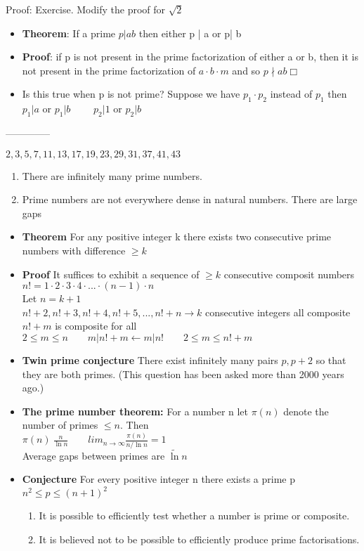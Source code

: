 \documentclass[9pt, letterpaper, oneside]{article}
\begin{document}
Proof: Exercise. Modify the proof for $\sqrt{2}$

\begin{itemize}
    \item \textbf{Theorem}: If a prime $p | ab$ then either p | a or p| b
    \item \textbf{Proof}: if p is not present in the prime factorization of either a or b, then it is not present in the prime factorization of $a \cdot b \cdot m$ and so $p \nmid a b \Box$
    \item Is this true when p is not prime? Suppose we have $p_1 \cdot p_2$ instead of $p_1$ then $p_1 | a$ or $p_1 | b \qquad$ $p_2 | 1$ or $p_2 | b$
\end{itemize}

--------------

$2,3,5,7,11,13,17,19,23,29,31,37,41,43$
\begin{enumerate}
    \item There are infinitely many prime numbers.
    \item Prime numbers are not everywhere dense in natural numbers. There are large gaps
\end{enumerate}

\begin{itemize}
    \item \textbf{Theorem} For any positive integer k there exists two consecutive prime numbers with difference $\geq k$
    \item \textbf{Proof} It suffices to exhibit a sequence of $\geq k$ consecutive composit numbers\\
            $n! = 1 \cdot 2 \cdot 3 \cdot 4 \cdot ... \cdot (n-1) \cdot n$\\
            Let $n = k + 1$\\
            $n! + 2, n! + 3, n! + 4, n! + 5,..., n! + n \to k$ consecutive integers all composite
            $n! + m$ is composite for all $2 \leq m \leq n \qquad m | n! + m \leftarrow m| n! \qquad 2 \leq m \leq n! + m$
    \item \textbf{Twin prime conjecture} There exist infinitely many pairs $p, p+2$ so that they are both primes. (This question has been asked more than 2000 years ago.)
    \item \textbf{The prime number theorem:} For a number n let $\pi(n)$ denote the number of primes $\leq n$. Then \\
            $\pi(n) ~ \frac{n}{\ln n} \qquad lim_{n \to \infty} \frac{\pi(n)}{n / \ln n} = 1$ \\
            Average gaps between primes are $\tilde \ln n$ 
    \item \textbf{Conjecture} For every positive integer n there exists a prime p $n^2 \leq p \leq (n+1)^2$
    \begin{enumerate}
        \item It is possible to efficiently test whether a number is prime or composite.
        \item It is believed not to be possible to efficiently produce prime factorisations.
    \end{enumerate}
\end{itemize}
\end{document}
